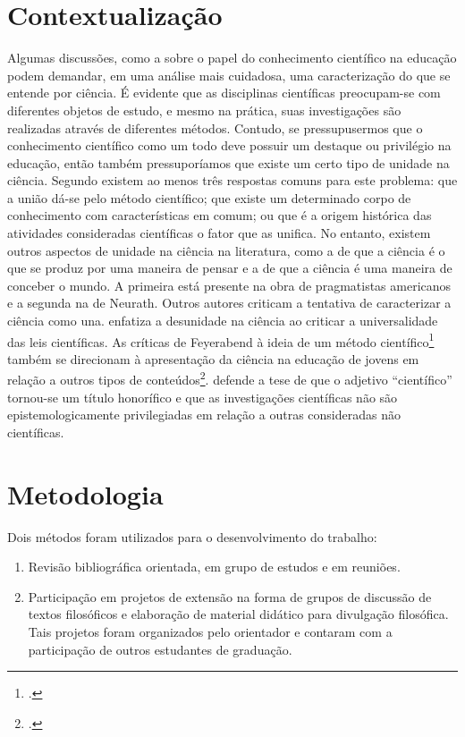 \documentclass[12pt]{report}
\begin{document}
		\section*{Contextualização}		
		Algumas discussões, como a sobre o papel do conhecimento científico na educação podem demandar, em uma análise mais cuidadosa, uma caracterização do que se entende por ciência.
		É evidente que as disciplinas científicas preocupam-se com diferentes objetos de estudo, e mesmo na prática, suas investigações são realizadas através de diferentes métodos.
		Contudo, se pressupusermos que o conhecimento científico como um todo deve possuir um destaque ou privilégio na educação, então também pressuporíamos que existe um certo tipo de unidade na ciência.
		Segundo \textcite{cunha-unidade} existem ao menos três respostas comuns para este problema: que a união dá-se pelo método científico; que existe um determinado corpo de conhecimento com características em comum; ou que é a origem histórica das atividades consideradas científicas o fator que as unifica.
		No entanto, existem outros aspectos de unidade na ciência na literatura, como a de que a ciência é o que se produz por uma maneira de pensar e a de que a ciência é uma maneira de conceber o mundo.
		A primeira está presente na obra de pragmatistas americanos e a segunda na de Neurath.
		Outros autores criticam a tentativa de caracterizar a ciência como una.
		\textcite{cartwright-dappled-world} enfatiza a desunidade na ciência ao criticar a universalidade das leis científicas.
		As críticas de Feyerabend à ideia de um método científico\footcite{feyerabend-against-method} também se direcionam à apresentação da ciência na educação de jovens em relação a outros tipos de conteúdos\footcite{feyerabend-science-free-society}.
		\textcite{haack-defending-science} defende a tese de que o adjetivo “científico” tornou-se um título honorífico e que as investigações científicas não são epistemologicamente privilegiadas em relação a outras consideradas não científicas.
	
		\section*{Metodologia}
		
		Dois métodos foram utilizados para o desenvolvimento do trabalho:
		
		\begin{enumerate}
			\item Revisão bibliográfica orientada, em grupo de estudos e em reuniões.
			\item Participação em projetos de extensão na forma de grupos de discussão de textos filosóficos e elaboração de material didático para divulgação filosófica.
			Tais projetos foram organizados pelo orientador e contaram com a participação de outros estudantes de graduação.
		\end{enumerate}
\end{document}
